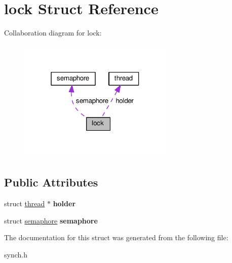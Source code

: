 \hypertarget{structlock}{}\section{lock Struct Reference}
\label{structlock}


Collaboration diagram for lock\+:
\nopagebreak
\begin{figure}[H]
\begin{center}
\leavevmode
\includegraphics[width=210pt]{structlock__coll__graph}
\end{center}
\end{figure}
\subsection*{Public Attributes}
\begin{DoxyCompactItemize}
\item 
struct \hyperlink{structthread}{thread} $\ast$ {\bfseries holder}\hypertarget{structlock_a810cc844d1cb512db077a531b5310c6c}{}\label{structlock_a810cc844d1cb512db077a531b5310c6c}

\item 
struct \hyperlink{structsemaphore}{semaphore} {\bfseries semaphore}\hypertarget{structlock_abb2cd5e8ae70282e2d1b584f347dc9f3}{}\label{structlock_abb2cd5e8ae70282e2d1b584f347dc9f3}

\end{DoxyCompactItemize}


The documentation for this struct was generated from the following file\+:\begin{DoxyCompactItemize}
\item 
synch.\+h\end{DoxyCompactItemize}
